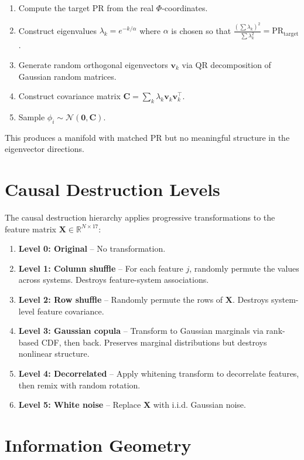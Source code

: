 \documentclass[10pt]{article}
\begin{document}
\begin{enumerate}
\item Compute the target PR from the real $\Phi$-coordinates.
\item Construct eigenvalues $\lambda_k = e^{-k/\alpha}$ where $\alpha$ is chosen so that $\frac{(\sum \lambda_k)^2}{\sum \lambda_k^2} = \text{PR}_{\text{target}}$.
\item Generate random orthogonal eigenvectors $\mathbf{v}_k$ via QR decomposition of Gaussian random matrices.
\item Construct covariance matrix $\mathbf{C} = \sum_k \lambda_k \mathbf{v}_k \mathbf{v}_k^\top$.
\item Sample $\phi_i \sim \mathcal{N}(\mathbf{0}, \mathbf{C})$.
\end{enumerate}

This produces a manifold with matched PR but no meaningful structure in the eigenvector directions.

\section{Causal Destruction Levels}
\label{sec:appendix_destruction}

The causal destruction hierarchy applies progressive transformations to the feature matrix $\mathbf{X} \in \mathbb{R}^{N \times 17}$:

\begin{enumerate}
\item \textbf{Level 0: Original} -- No transformation.
\item \textbf{Level 1: Column shuffle} -- For each feature $j$, randomly permute the values across systems. Destroys feature-system associations.
\item \textbf{Level 2: Row shuffle} -- Randomly permute the rows of $\mathbf{X}$. Destroys system-level feature covariance.
\item \textbf{Level 3: Gaussian copula} -- Transform to Gaussian marginals via rank-based CDF, then back. Preserves marginal distributions but destroys nonlinear structure.
\item \textbf{Level 4: Decorrelated} -- Apply whitening transform to decorrelate features, then remix with random rotation.
\item \textbf{Level 5: White noise} -- Replace $\mathbf{X}$ with i.i.d. Gaussian noise.
\end{enumerate}

\section{Information Geometry}
\label{sec:appendix_info}
\end{document}

